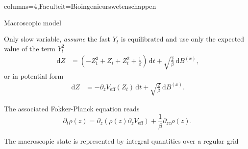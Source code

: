 \documentclass[landscape,a0paper,fontscale=0.45]{kuleuvenposter}
\newcommand{\dd}{\,\mathrm{d}}
\newcommand\eff{\mbox{eff}}
\begin{document}
\begin{poster}{columns=4,Faculteit=Bioingenieurswetenschappen}
\begin{posterbox}[name=macroscopic, column=0,below=microscopic, above=bottom]{Macroscopic model}
\begin{noindentitemize}
\item Only slow variable, \emph{assume} the fast $Y_t$ is equilibrated and use only the expected value of the term $Y_t^2$
\begin{align}
\dd Z &= (-Z_t^3 + Z_t + Z_t^2 + \frac{1}{\beta}) \dd t + \sqrt{\frac{2}{\beta}} \dd B^{(x)}, \label{eq:zParisdyn}
\end{align}
or in potential form
\begin{align}
\dd Z &= -\partial_z V_{\eff} (Z_t) \dd t + \sqrt{\frac{2}{\beta}} \dd B^{(x)}. \label{eq:zParisdyn_pot}
\end{align}
%
\item The associated Fokker-Planck equation reads
\begin{equation}
\partial_t \rho(z) = \partial_z \left( \rho(z) \partial_z V_{\eff} \right) + \frac{1}{\beta} \partial_{zz} \rho(z).
\end{equation}
\item The macroscopic state is represented by integral quantities over a regular grid
\end{noindentitemize}
\end{posterbox}


\end{poster}
\end{document}
